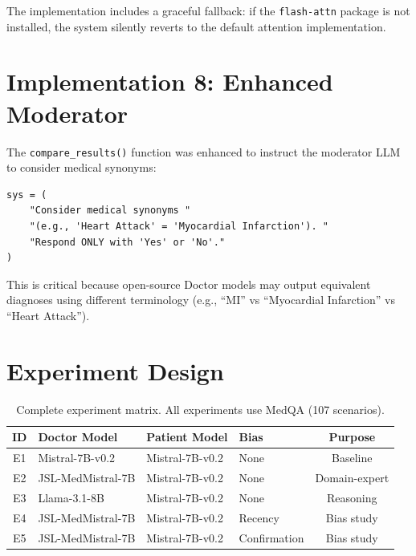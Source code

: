 \documentclass[12pt, a4paper]{article}
\begin{document}
The implementation includes a graceful fallback: if the \texttt{flash-attn}
package is not installed, the system silently reverts to the default
attention implementation.

\section{Implementation 8: Enhanced Moderator}
\label{sec:moderator}

The \texttt{compare\_results()} function was enhanced to instruct the
moderator LLM to consider medical synonyms:

\begin{lstlisting}
sys = (
    "Consider medical synonyms "
    "(e.g., 'Heart Attack' = 'Myocardial Infarction'). "
    "Respond ONLY with 'Yes' or 'No'."
)
\end{lstlisting}

This is critical because open-source Doctor models may output equivalent
diagnoses using different terminology (e.g., ``MI'' vs ``Myocardial
Infarction'' vs ``Heart Attack'').

\section{Experiment Design}
\label{sec:experiments}

\begin{table}[H]
\centering
\caption{Complete experiment matrix. All experiments use MedQA (107 scenarios).}
\label{tab:experiments}
\begin{tabular}{clllc}
\toprule
\textbf{ID} & \textbf{Doctor Model} & \textbf{Patient Model} & \textbf{Bias} & \textbf{Purpose} \\
\midrule
E1 & Mistral-7B-v0.2 & Mistral-7B-v0.2 & None & Baseline \\
E2 & JSL-MedMistral-7B & Mistral-7B-v0.2 & None & Domain-expert \\
E3 & Llama-3.1-8B & Mistral-7B-v0.2 & None & Reasoning \\
E4 & JSL-MedMistral-7B & Mistral-7B-v0.2 & Recency & Bias study \\
E5 & JSL-MedMistral-7B & Mistral-7B-v0.2 & Confirmation & Bias study \\
\bottomrule
\end{tabular}
\end{table}
\end{document}
